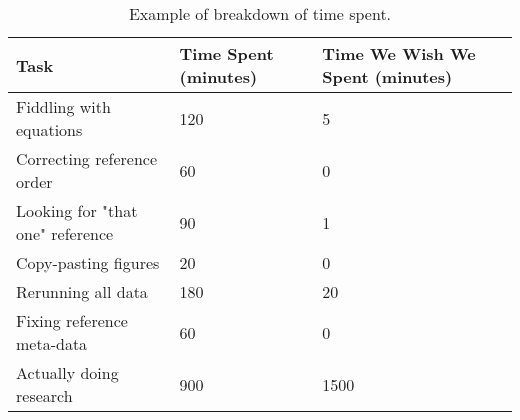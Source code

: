 \begin{table}[h!]
\centering
\caption{Example of breakdown of time spent.}
\label{tab:breakdown}
\begin{tabular}{@{}lll@{}}
\toprule
Task                             & Time Spent (minutes) & Time We Wish We Spent (minutes) \\ \midrule
Fiddling with equations          & 120                  & 5                               \\
Correcting reference order       & 60                   & 0                               \\
Looking for "that one" reference & 90                   & 1                               \\
Copy-pasting figures             & 20                   & 0                               \\
Rerunning all data               & 180                  & 20                              \\
Fixing reference meta-data       & 60                   & 0                               \\
Actually doing research          & 900                  & 1500                            \\ \bottomrule
\end{tabular}
\end{table}